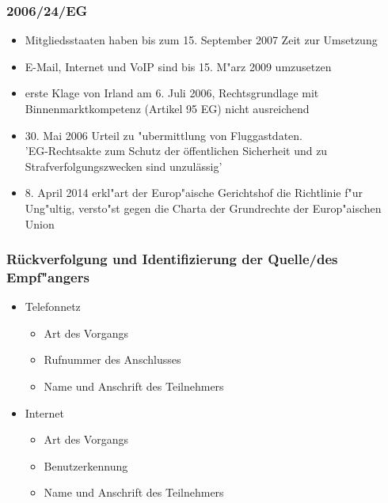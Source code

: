     \begin{frame}
      \frametitle{2006/24/EG}
      \begin{itemize}
        \item 
          Mitgliedsstaaten haben bis zum 15. September 2007 Zeit zur Umsetzung
        \item 
          E-Mail, Internet und VoIP sind bis 15. M"arz 2009 umzusetzen
        \item
          erste Klage von Irland am 6. Juli 2006, Rechtsgrundlage mit Binnenmarktkompetenz (Artikel 95 EG) nicht ausreichend
        \item
          30. Mai 2006 Urteil zu "ubermittlung von Fluggastdaten.\\
          'EG-Rechtsakte zum Schutz der öffentlichen Sicherheit und zu Strafverfolgungszwecken sind unzulässig'
        \item 
          8. April 2014 erkl"art der Europ"aische Gerichtshof die Richtlinie f"ur Ung"ultig, versto"st gegen die Charta der Grundrechte der Europ"aischen Union
      \end{itemize}
    \end{frame}

    \begin{frame}
      \frametitle{Rückverfolgung und Identifizierung der Quelle/des Empf"angers}
      \begin{itemize}
        \item Telefonnetz
        \begin{itemize}
          \item Art des Vorgangs
          \item Rufnummer des Anschlusses
          \item Name und Anschrift des Teilnehmers
        \end{itemize}
        \item Internet
        \begin{itemize}
          \item Art des Vorgangs
          \item Benutzerkennung
          \item Name und Anschrift des Teilnehmers
        \end{itemize}
      \end{itemize}
    \end{frame}

